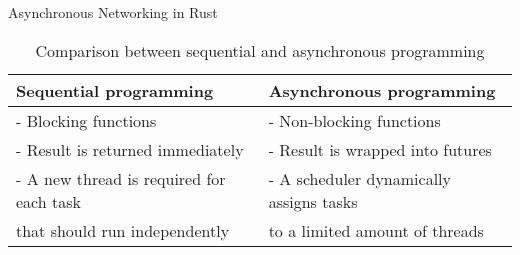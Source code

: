 \begin{frame}{Asynchronous Networking in Rust}
    \begin{table}
        \begin{tabular}{l l}
            \toprule
            \textbf{Sequential programming}          & \textbf{Asynchronous programming}       \\
            \midrule
            - Blocking functions                     & - Non-blocking functions                \\
            - Result is returned immediately         & - Result is wrapped into futures        \\
            - A new thread is required for each task & - A scheduler dynamically assigns tasks \\
            that should run independently            & to a limited amount of threads          \\
            \bottomrule
        \end{tabular}
        \caption{Comparison between sequential and asynchronous programming}
    \end{table}

\end{frame}
